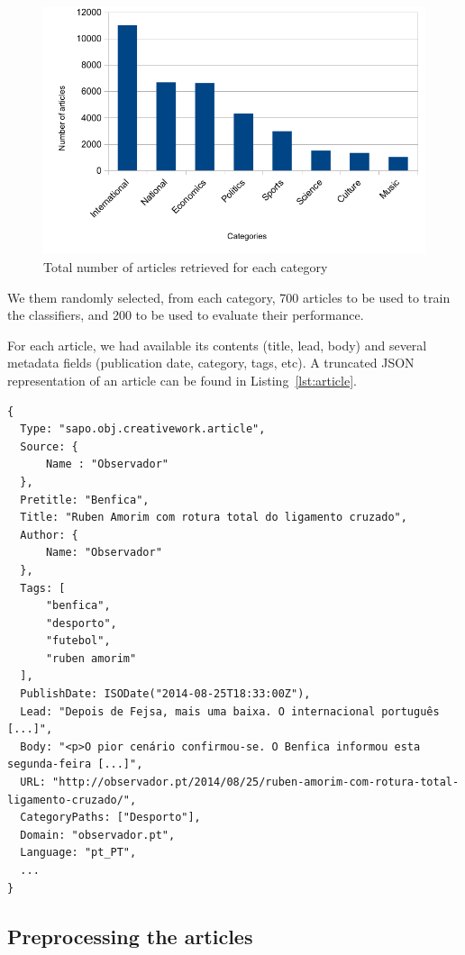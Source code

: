 \documentclass[runningheads,a4paper]{llncs}[2015/06/24]
\newcounter{listing}
\begin{document}
\begin{figure}[H]
\centerline{\includegraphics[width=.97\columnwidth]{imgs/articles}}
\caption{Total number of articles retrieved for each category}
\label{fig:articles}
\end{figure}

We them randomly selected, from each category, 700 articles to be used
to train the classifiers, and 200 to be used to evaluate their
performance.

For each article, we had available its contents (title, lead, body)
and several metadata fields (publication date, category, tags, etc). A
truncated JSON representation of an article can be found in
Listing~\ref{lst:article}.


\begin{lstlisting}[float,floatplacement=H,caption={Example of JSON representation of an article},label={lst:article}, extendedchars=true]
{
  Type: "sapo.obj.creativework.article",
  Source: {
      Name : "Observador"
  },
  Pretitle: "Benfica",
  Title: "Ruben Amorim com rotura total do ligamento cruzado",
  Author: {
      Name: "Observador"
  },
  Tags: [
      "benfica",
      "desporto",
      "futebol",
      "ruben amorim"
  ],
  PublishDate: ISODate("2014-08-25T18:33:00Z"),
  Lead: "Depois de Fejsa, mais uma baixa. O internacional português [...]",
  Body: "<p>O pior cenário confirmou-se. O Benfica informou esta segunda-feira [...]",
  URL: "http://observador.pt/2014/08/25/ruben-amorim-com-rotura-total-ligamento-cruzado/",
  CategoryPaths: ["Desporto"],
  Domain: "observador.pt",
  Language: "pt_PT",
  ...
}
\end{lstlisting}

\subsection{Preprocessing the articles}
\label{sec:preproc}
\end{document}
